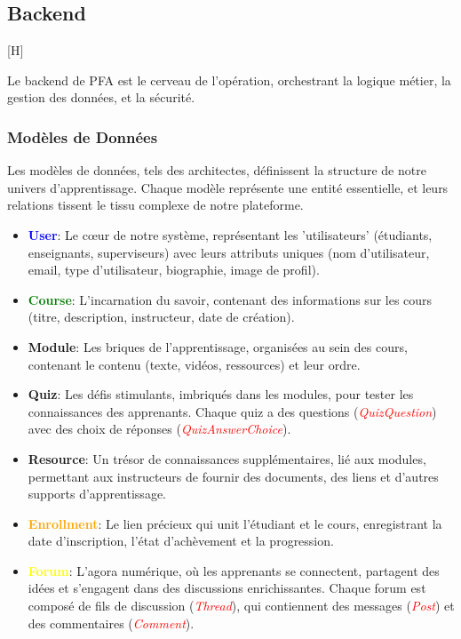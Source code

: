 \subsection{Backend}[H]

Le backend de PFA est le cerveau de l'opération, orchestrant la logique métier, la gestion des données, et la sécurité.

\subsubsection{Modèles de Données}

Les modèles de données, tels des architectes, définissent la structure de notre univers d'apprentissage. Chaque modèle représente une entité essentielle, et leurs relations tissent le tissu complexe de notre plateforme.

\begin{itemize}
    \item \textbf{\textcolor{blue}{User}}: Le cœur de notre système, représentant les 'utilisateurs' (étudiants, enseignants, superviseurs) avec leurs attributs uniques (nom d'utilisateur, email, type d'utilisateur, biographie, image de profil).
    \item \textbf{\textcolor{green}{Course}}: L'incarnation du savoir, contenant des informations sur les cours (titre, description, instructeur, date de création).
    \item \textbf{\textcolor{green!50}{Module}}: Les briques de l'apprentissage, organisées au sein des cours, contenant le contenu (texte, vidéos, ressources) et leur ordre.
    \item \textbf{\textcolor{green!30}{Quiz}}: Les défis stimulants, imbriqués dans les modules, pour tester les connaissances des apprenants. Chaque quiz a des questions (\textit{\textcolor{red}{QuizQuestion}}) avec des choix de réponses (\textit{\textcolor{red}{QuizAnswerChoice}}).
    \item \textbf{\textcolor{green!70}{Resource}}: Un trésor de connaissances supplémentaires, lié aux modules, permettant aux instructeurs de fournir des documents, des liens et d'autres supports d'apprentissage.
    \item \textbf{\textcolor{orange}{Enrollment}}: Le lien précieux qui unit l'étudiant et le cours, enregistrant la date d'inscription, l'état d'achèvement et la progression.
    \item \textbf{\textcolor{yellow}{Forum}}: L'agora numérique, où les apprenants se connectent, partagent des idées et s'engagent dans des discussions enrichissantes. Chaque forum est composé de fils de discussion (\textit{\textcolor{red}{Thread}}), qui contiennent des messages (\textit{\textcolor{red}{Post}}) et des commentaires (\textit{\textcolor{red}{Comment}}).
\end{itemize}

